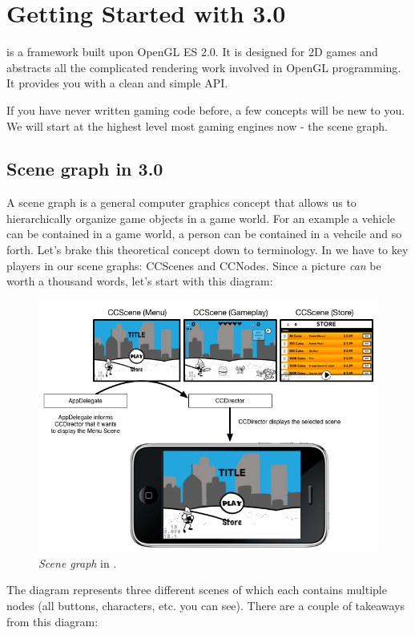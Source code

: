 \chapter{Getting Started with \cocos{} 3.0}
\cocos{} is a framework built upon OpenGL ES 2.0. It is designed for 2D games
and abstracts all the complicated rendering work involved in OpenGL programming.
It provides you with a clean and simple API.

If you have never written gaming code before, a few concepts will be new to you.
We will start at the highest level most gaming engines now - the scene graph.

\section{Scene graph in \cocos{} 3.0}
A scene graph is a general computer graphics concept that allows us to
hierarchically organize game objects in a game world. For an example a vehicle can be contained in a game world, a
person can be contained in a vehcile and so forth.
Let's brake this theoretical concept down to \cocos{} terminology. In
\cocos{} we have to key players in our scene graphs: CCScenes and CCNodes. Since
a picture \textit{can} be worth a thousand words, let's start with this diagram:

\begin{figure}[H]
		\includegraphics[width=400pt]{images/scenegraph.png}     
		\caption{\textit{Scene graph} in \cocos{}.}
\end{figure}
 
The diagram represents three different scenes of which each contains
multiple nodes (all buttons, characters, etc. you can see). There are a couple
of takeaways from this diagram:

